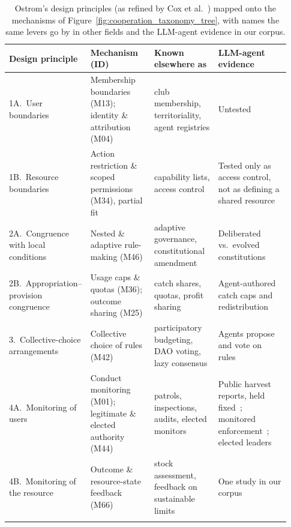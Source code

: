 \documentclass[runningheads]{llncs}
\newcommand{\rowline}{\arrayrulecolor{black!22}\specialrule{0.4pt}{2pt}{2pt}\arrayrulecolor{black}}
\begin{document}
\begin{table}[!tbp]
\centering
\caption{Ostrom's design principles (as refined by Cox et al.~\mbox{\citep{cox2010designprinciples}}) mapped onto the mechanisms of Figure~\mbox{\ref{fig:cooperation_taxonomy_tree}}, with names the same levers go by in other fields and the LLM-agent evidence in our corpus.}
\label{tab:ostrom-map}
\scriptsize
\renewcommand{\arraystretch}{1.0}
\setlength{\tabcolsep}{4pt}
\begin{tabular}{@{}>{\raggedright\arraybackslash}p{0.21\linewidth} >{\raggedright\arraybackslash}p{0.23\linewidth} >{\raggedright\arraybackslash}p{0.23\linewidth} >{\raggedright\arraybackslash}p{0.26\linewidth}@{}}
\toprule
\textbf{Design principle} & \textbf{Mechanism (ID)} & \textbf{Known elsewhere as} & \textbf{LLM-agent evidence} \\
\midrule
1A.~User boundaries & Membership boundaries (M13); identity \& attribution (M04) & club membership, territoriality, agent registries & Untested \\ \rowline
1B.~Resource boundaries & Action restriction \& scoped permissions (M34), partial fit & capability lists, access control & Tested only as access control, not as defining a shared resource \\ \rowline
2A.~Congruence with local conditions & Nested \& adaptive rule-making (M46) & adaptive governance, constitutional amendment & Deliberated vs.\ evolved constitutions~\citep{niranjani2026constitutional} \\ \rowline
2B.~Appropriation--provision congruence & Usage caps \& quotas (M36); outcome sharing (M25) & catch shares, quotas, profit sharing & Agent-authored catch caps and redistribution~\citep{rehm2026selfgovernance} \\ \rowline
3.~Collective-choice arrangements & Collective choice of rules (M42) & participatory budgeting, DAO voting, lazy consensus & Agents propose and vote on rules~\mbox{\citep{rehm2026selfgovernance,niranjani2026constitutional,hota2025nomiclaw}} \\ \rowline
4A.~Monitoring of users & Conduct monitoring (M01); legitimate \& elected authority (M44) & patrols, inspections, audits, elected monitors & Public harvest reports, held fixed~\citep{piatti2024govsim}; monitored enforcement~\citep{bracalesyrnikov2026institutionalai}; elected leaders~\mbox{\citep{faulkner2026evaluatingcooperationllmsocial}} \\ \rowline
4B.~Monitoring of the resource & Outcome \& resource-state feedback (M66) & stock assessment, feedback on sustainable limits & One study in our corpus \\ \rowline

\end{tabular}
\end{table}
\end{document}
